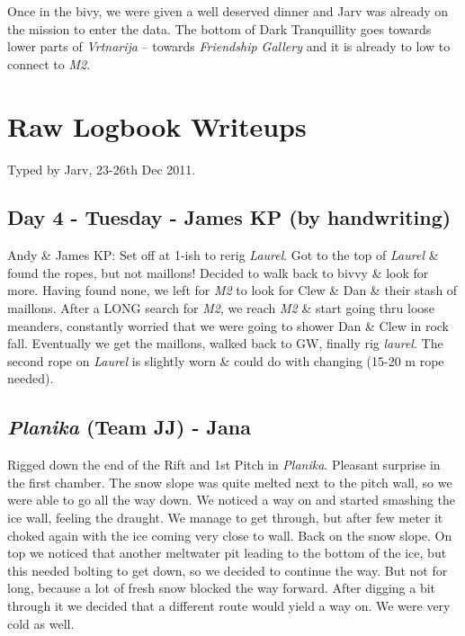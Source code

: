 Once in the bivy, we were given a well deserved dinner and Jarv was
already on the mission to enter the data. The bottom of Dark
Tranquillity goes towards lower parts of \emph{Vrtnarija} -- towards
\emph{Friendship Gallery} and it is already to low to connect to
\emph{M2}.

\attrib{\izi}

\hypertarget{raw-logbook-writeups}{%
\section{Raw Logbook Writeups}\label{raw-logbook-writeups}}

Typed by Jarv, 23-26th Dec 2011.

\hypertarget{day-4---tuesday---james-kp-by-handwriting}{%
\subsection{Day 4 - Tuesday - James KP (by
handwriting)}\label{day-4---tuesday---james-kp-by-handwriting}}

Andy \& James KP: Set off at 1-ish to rerig \emph{Laurel}. Got to the
top of \emph{Laurel} \& found the ropes, but not maillons! Decided to
walk back to bivvy \& look for more. Having found none, we left for
\emph{M2} to look for Clew \& Dan \& their stash of maillons. After a
LONG search for \emph{M2}, we reach \emph{M2} \& start going thru loose
meanders, constantly worried that we were going to shower Dan \& Clew in
rock fall. Eventually we get the maillons, walked back to GW, finally
rig \emph{laurel}. The second rope on \emph{Laurel} is slightly worn \&
could do with changing (15-20 m rope needed).

\hypertarget{planika-team-jj---jana}{%
\subsection{\texorpdfstring{\emph{Planika} (Team JJ) -
Jana}{Planika (Team JJ) - Jana}}\label{planika-team-jj---jana}}

Rigged down the end of the Rift and 1st Pitch in \emph{Planika}.
Pleasant surprise in the first chamber. The snow slope was quite melted
next to the pitch wall, so we were able to go all the way down. We
noticed a way on and started smashing the ice wall, feeling the draught.
We manage to get through, but after few meter it choked again with the
ice coming very close to wall. Back on the snow slope. On top we noticed
that another meltwater pit leading to the bottom of the ice, but this
needed bolting to get down, so we decided to continue the way. But not
for long, because a lot of fresh snow blocked the way forward. After
digging a bit through it we decided that a different route would yield a
way on. We were very cold as well.

